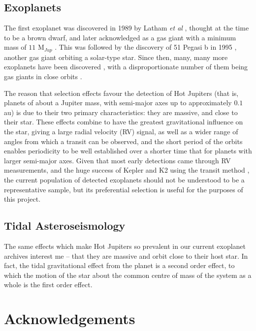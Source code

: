 \documentclass[11pt]{amsart}
\begin{document}
\subsection{Exoplanets}

The first exoplanet was discovered in 1989 by Latham \textit{et al} \cite{Latham1989}, thought at the time to be a brown dwarf, and later acknowledged as a gas giant with a minimum mass of $11$ M$_{Jup}$ \cite{Wang2012}.  This was followed by the discovery of 51 Pegasi b in 1995 \cite{Mayor1995}, another gas giant orbiting a solar-type star.  Since then, many, many more exoplanets have been discovered \cite{NASAExoplanet}, with a disproportionate number of them being gas giants in close orbits \cite{Winn2014}.

The reason that selection effects favour the detection of Hot Jupiters (that is, planets of about a Jupiter mass, with semi-major axes up to approximately $0.1$ au) is due to their two primary characteristics: they are massive, and close to their star.  These effects combine to have the greatest gravitational influence on the star, giving a large radial velocity (RV) signal, as well as a wider range of angles from which a transit can be observed, and the short period of the orbits enables periodicity to be well established over a shorter time that for planets with larger semi-major axes.  Given that most early detections came through RV measurements, and the huge success of Kepler and K2 using the transit method \cite{Coughlin2016}, the current population of detected exoplanets should not be understood to be a representative sample, but its preferential selection is useful for the purposes of this project.


\subsection{Tidal Asteroseismology}

The same effects which make Hot Jupiters so prevalent in our current exoplanet archives interest me -- that they are massive and orbit close to their host star.  In fact, the tidal gravitational effect from the planet is a second order effect, to which the motion of the star about the common centre of mass of the system as a whole is the first order effect.







\section{Acknowledgements}
\end{document}
